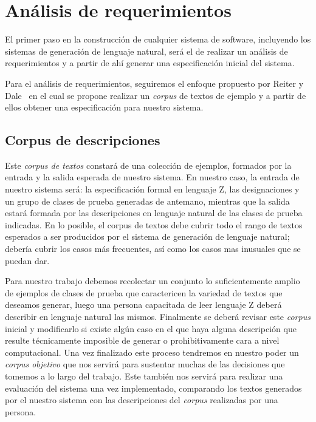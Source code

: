 \chapter{Análisis de requerimientos}
\label{cap:corpus}

El primer paso en la construcción de cualquier sistema de software, incluyendo los sistemas de generación de lenguaje natural, será el de realizar un análisis de requerimientos y a partir de ahí generar una especificación inicial del sistema. 

Para el análisis de requerimientos, seguiremos el enfoque propuesto por Reiter y Dale~\cite{reiter_dale} en el cual se propone realizar un \emph{corpus} de textos de ejemplo y a partir de ellos obtener una especificación para nuestro sistema.  

\section{Corpus de descripciones}                 

Este \emph{corpus de textos} constará de una colección de ejemplos, formados por la entrada y la salida esperada de nuestro sistema. En nuestro caso, la entrada de nuestro sistema será: la especificación formal en lenguaje Z, las designaciones y un grupo de clases de prueba generadas de antemano, mientras que la salida estará formada por las descripciones en lenguaje natural de las clases de prueba indicadas. En lo posible, el corpus de textos debe cubrir todo el rango de textos esperados a ser producidos por el sistema de generación de lenguaje natural; debería cubrir los casos más frecuentes, así como los casos mas inusuales que se puedan dar.

Para nuestro trabajo debemos recolectar un conjunto lo suficientemente amplio de ejemplos de clases de prueba que caractericen la variedad de textos que deseamos generar, luego una persona capacitada de leer lenguaje Z deberá describir en lenguaje natural las mismos. Finalmente se deberá revisar este \emph{corpus} inicial y modificarlo si existe algún caso en el que haya alguna descripción que resulte técnicamente imposible de generar o prohibitivamente cara a nivel computacional. Una vez finalizado este proceso tendremos en nuestro poder un \emph{corpus objetivo} que nos servirá para sustentar muchas de las decisiones que tomemos a lo largo del trabajo. Este también nos servirá para realizar una evaluación del sistema una vez implementado, comparando los textos generados por el nuestro sistema con las descripciones del \emph{corpus} realizadas por una persona.

